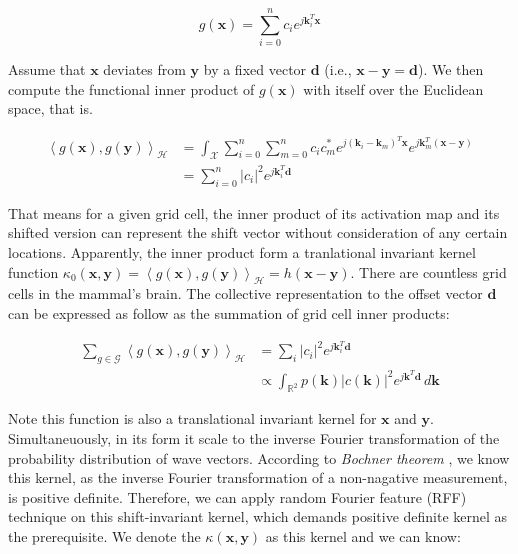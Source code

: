 \documentclass[letterpaper]{article} %
\begin{document}
\begin{equation}
g(\boldsymbol{x}) = \sum_{i=0}^{n} c_i e^{j \boldsymbol{k}_i^T \boldsymbol{x}}
\end{equation}

Assume that \(\boldsymbol{x}\) deviates from \(\boldsymbol{y}\) by a fixed vector \(\boldsymbol{d}\) (i.e., \(\boldsymbol{x} - \boldsymbol{y} = \boldsymbol{d}\)). We then compute the functional inner product of \(g(\boldsymbol{x})\) with itself over the Euclidean space, that is. 

\begin{equation}
\begin{aligned} 
\left\langle g(\boldsymbol{x}), g(\boldsymbol{y}) \right\rangle _\mathcal{H} 
&= \int_{\mathcal{X}} \sum_{i=0}^{n} \sum_{m=0}^{n} c_i c_m^* e^{j(\boldsymbol{k}_i - \boldsymbol{k}_m)^T \boldsymbol{x}} e^{j \boldsymbol{k}_m^T (\boldsymbol{x} - \boldsymbol{y})} \\
&= \sum_{i=0}^{n} |c_i|^2 e^{j \boldsymbol{k}_i^T \boldsymbol{d}}
\end{aligned}
\end{equation}

That means for a given grid cell, the inner product of its activation map and its shifted version can represent the shift vector without consideration of any certain locations. Apparently, the inner product form a tranlational invariant kernel function $\kappa_0(\boldsymbol{x}, \boldsymbol{y})= \left \langle g(\boldsymbol{x})  , g(\boldsymbol{y}) \right \rangle _\mathcal{H} =h(\boldsymbol{x}- \boldsymbol{y})$. There are countless grid cells in the mammal's brain. The collective representation to the offset vector $\boldsymbol{d}$ can be expressed as follow as the summation of grid cell inner products:

\begin{equation}
\begin{aligned}
\sum_{g \in \mathcal{G}} \left\langle g(\boldsymbol{x}), g(\boldsymbol{y}) \right\rangle _\mathcal{H} 
&= \sum_{i} |c_i|^2 e^{j \boldsymbol{k}_i^T \boldsymbol{d}} \\
&\propto \int_{\mathbb{R}^2} p(\boldsymbol{k}) |c(\boldsymbol{k})|^2 e^{j \boldsymbol{k}^T \boldsymbol{d}} \, d\boldsymbol{k}
\end{aligned}
\end{equation}

Note this function is also a translational invariant kernel for $\boldsymbol{x}$ and $\boldsymbol{y}$. Simultaneuously, in its form it scale to the inverse Fourier transformation of the probability distribution of wave vectors. According to \emph{Bochner theorem} \cite{bochner2005harmonic}, we know this kernel, as the inverse Fourier transformation of a non-nagative measurement, is positive definite. Therefore, we can apply random Fourier feature (RFF) \cite{rahimi2007random} technique on this shift-invariant kernel, which demands positive definite kernel as the prerequisite. We denote the $\kappa(\boldsymbol{x}, \boldsymbol{y})$ as this kernel and we can know:
\end{document}
